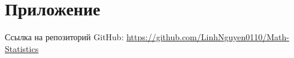 \section{Приложение}
\noindent Ссылка на репозиторий GitHub: \url{https://github.com/LinhNguyen0110/Math-Statistics}